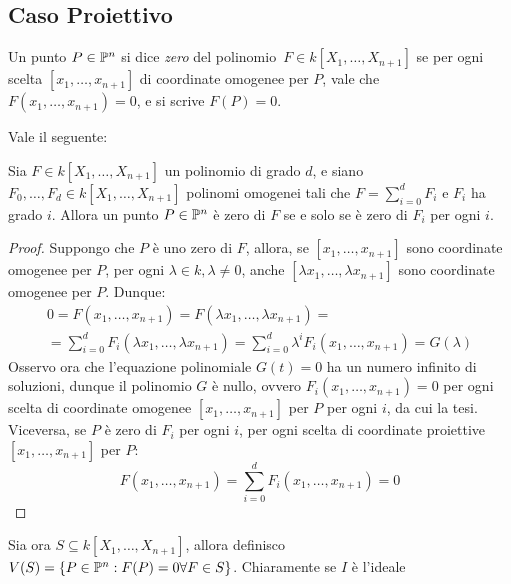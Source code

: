         \subsection{Caso Proiettivo}
            \begin{definizione}
                Un punto $P \in \P^n$ si dice \emph{zero} del polinomio $\, F \in k[X_1,\ldots,X_{n+1}]$ se per ogni scelta $[x_1,\ldots,x_{n+1}]$ 
                di coordinate omogenee per $P$, vale che $F(x_1,\ldots,x_{n+1}) = 0$, e si scrive $F(P) = 0$.
            \end{definizione}
            Vale il seguente:
            \begin{lemma}
                Sia $F \in k[X_1,\ldots,X_{n+1}]$ un polinomio di grado $d$, e siano $F_0,\ldots,F_d \in k[X_1,\ldots,X_{n+1}]$ polinomi omogenei tali che 
                $F = \sum_{i=0}^d F_i$ e $F_i$ ha grado $i$. Allora un punto $P \in \P^n$ è zero di $F$ se e solo se è zero di $F_i$ per ogni $i$.
            \end{lemma}
            \begin{proof}
                Suppongo che $P$ è uno zero di $F$, allora, se $[x_1,\ldots,x_{n+1}]$ sono coordinate omogenee per $P$, per ogni 
                $\lambda \in k, \lambda \neq 0$, anche $[\lambda x_1, \ldots, \lambda x_{n+1}]$ sono coordinate omogenee per $P$. Dunque:
                \begin{multline*}
                    0 = F(x_1,\ldots,x_{n+1}) = F(\lambda x_1,\ldots,\lambda x_{n+1}) = \\
                    = \sum_{i=0}^d F_i(\lambda x_1,\ldots,\lambda x_{n+1}) 
                    = \sum_{i=0}^d \lambda^i F_i(x_1,\ldots,x_{n+1}) = G(\lambda)
                \end{multline*}
                Osservo ora che l'equazione polinomiale $G(t) = 0$ ha un numero infinito di soluzioni, dunque il polinomio $G$ è nullo, ovvero 
                $F_i(x_1,\ldots,x_{n+1}) = 0$ per ogni scelta di coordinate omogenee $[x_1,\ldots,x_{n+1}]$ per $P$ per ogni $i$, da cui la tesi. \\
                Viceversa, se $P$ è zero di $F_i$ per ogni $i$, per ogni scelta di coordinate proiettive $[x_1,\ldots,x_{n+1}]$ per $P$:
                \begin{equation*}
                    F(x_1,\ldots,x_{n+1}) = \sum_{i=0}^d F_i(x_1,\ldots,x_{n+1}) = 0
                \end{equation*}
            \end{proof}
            Sia ora $S \subseteq k[X_1,\ldots,X_{n+1}]$, allora definisco $V(S) = \{P \in \P^n : F(P) = 0 \forall F \in S\}$. Chiaramente se $I$ è l'ideale 
